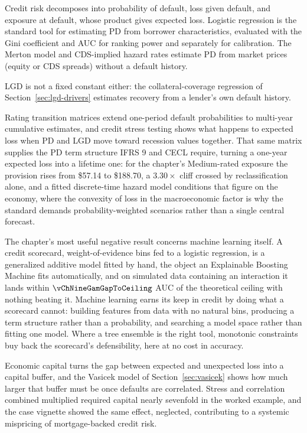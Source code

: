 \documentclass[../ai_in_finance]{subfiles}
\begin{document}
Credit risk decomposes into probability of default, loss given default, and exposure at default, whose product gives expected loss. Logistic regression is the standard tool for estimating PD from borrower characteristics, evaluated with the Gini coefficient and AUC for ranking power and separately for calibration. The Merton model and CDS-implied hazard rates estimate PD from market prices (equity or CDS spreads) without a default history.

LGD is not a fixed constant either: the collateral-coverage regression of Section~\ref{sec:lgd-drivers} estimates recovery from a lender's own default history.

Rating transition matrices extend one-period default probabilities to multi-year cumulative estimates, and credit stress testing shows what happens to expected loss when PD and LGD move toward recession values together. That same matrix supplies the PD term structure IFRS 9 and CECL require, turning a one-year expected loss into a lifetime one: for the chapter's Medium-rated exposure the provision rises from \$57.14 to \$188.70, a $3.30\times$ cliff crossed by reclassification alone, and a fitted discrete-time hazard model conditions that figure on the economy, where the convexity of loss in the macroeconomic factor is why the standard demands probability-weighted scenarios rather than a single central forecast.

The chapter's most useful negative result concerns machine learning itself. A credit scorecard, weight-of-evidence bins fed to a logistic regression, is a generalized additive model fitted by hand, the object an Explainable Boosting Machine fits automatically, and on simulated data containing an interaction it lands within $\vChNineGamGapToCeiling$ AUC of the theoretical ceiling with nothing beating it. Machine learning earns its keep in credit by doing what a scorecard cannot: building features from data with no natural bins, producing a term structure rather than a probability, and searching a model space rather than fitting one model. Where a tree ensemble is the right tool, monotonic constraints buy back the scorecard's defensibility, here at no cost in accuracy.

Economic capital turns the gap between expected and unexpected loss into a capital buffer, and the Vasicek model of Section~\ref{sec:vasicek} shows how much larger that buffer must be once defaults are correlated. Stress and correlation combined multiplied required capital nearly sevenfold in the worked example, and the case vignette showed the same effect, neglected, contributing to a systemic mispricing of mortgage-backed credit risk.
\end{document}
